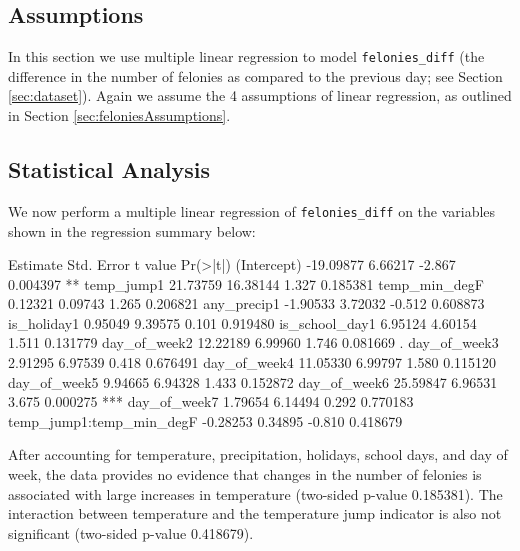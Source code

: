 \documentclass[11pt,notitlepage]{article}
\newenvironment{codeSmall}%
   {\par\noindent\adjustbox{margin=1ex,bgcolor=shadecolor,margin=0ex \medskipamount}\bgroup\minipage\linewidth\verbatim\footnotesize}%
   {\endverbatim\endminipage\egroup}
\begin{document}
\subsection{Assumptions}
\label{sec:feloniesDiffAssumptions}


In this section we use multiple linear regression to model \texttt{felonies_diff} (the difference in the number of felonies as compared to the previous day; see Section \ref{sec:dataset}). Again we assume the 4 assumptions of linear regression, as outlined in Section \ref{sec:feloniesAssumptions}.

\subsection{Statistical Analysis}
\label{sec:modelFeloniesDiffMultipleRegression}


We now perform a multiple linear regression of \texttt{felonies_diff} on the variables shown in the regression summary below:

\begin{codeSmall}
                          Estimate Std. Error t value Pr(>|t|)    
(Intercept)              -19.09877    6.66217  -2.867 0.004397 ** 
temp_jump1                21.73759   16.38144   1.327 0.185381    
temp_min_degF              0.12321    0.09743   1.265 0.206821    
any_precip1               -1.90533    3.72032  -0.512 0.608873    
is_holiday1                0.95049    9.39575   0.101 0.919480    
is_school_day1             6.95124    4.60154   1.511 0.131779    
day_of_week2              12.22189    6.99960   1.746 0.081669 .  
day_of_week3               2.91295    6.97539   0.418 0.676491    
day_of_week4              11.05330    6.99797   1.580 0.115120    
day_of_week5               9.94665    6.94328   1.433 0.152872    
day_of_week6              25.59847    6.96531   3.675 0.000275 ***
day_of_week7               1.79654    6.14494   0.292 0.770183    
temp_jump1:temp_min_degF  -0.28253    0.34895  -0.810 0.418679    
\end{codeSmall}




After accounting for temperature, precipitation, holidays, school days, and day of week, the data provides no evidence that changes in the number of felonies is associated with large increases in temperature (two-sided p-value 0.185381). The interaction between temperature and the temperature jump indicator is also not significant (two-sided p-value 0.418679).
\end{document}
